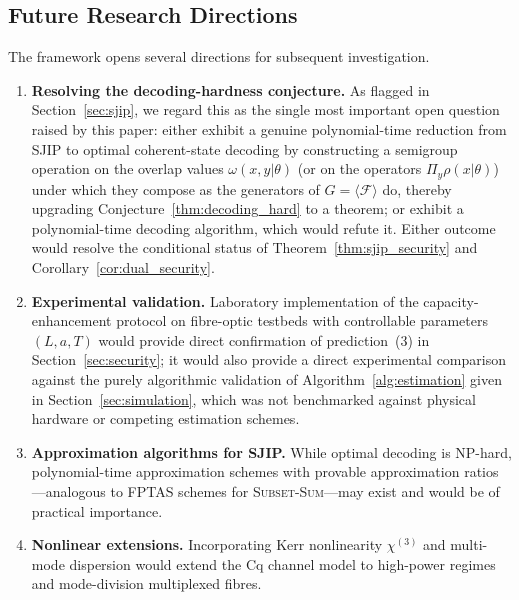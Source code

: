 \documentclass[journal,twocolumn]{IEEEtran}
\theoremstyle{definition}
\theoremstyle{plain}
\begin{document}
\subsection{Future Research Directions}

The framework opens several directions for subsequent investigation.

\begin{enumerate}[leftmargin=*, label=(\arabic*), itemsep=2pt]
  \item \textbf{Resolving the decoding-hardness conjecture.}  As
    flagged in Section~\ref{sec:sjip}, we regard this as the single
    most important open question raised by this paper: either
    exhibit a genuine polynomial-time reduction from SJIP to optimal
    coherent-state decoding by constructing a semigroup operation on
    the overlap values $\omega(x,y|\theta)$ (or on the operators
    $\Pi_y\rho(x|\theta)$) under which they compose as the generators
    of $G=\langle\mathcal F\rangle$ do, thereby upgrading
    Conjecture~\ref{thm:decoding_hard} to a theorem; or exhibit a
    polynomial-time decoding algorithm, which would refute it.
    Either outcome would resolve the conditional status of
    Theorem~\ref{thm:sjip_security} and
    Corollary~\ref{cor:dual_security}.

  \item \textbf{Experimental validation.}  Laboratory implementation
    of the capacity-enhancement protocol on fibre-optic testbeds
    with controllable parameters $(L, a, T)$ would provide direct
    confirmation of prediction~(3) in Section~\ref{sec:security}; it
    would also provide a direct experimental comparison against the
    purely algorithmic validation of Algorithm~\ref{alg:estimation}
    given in Section~\ref{sec:simulation}, which was not benchmarked
    against physical hardware or competing estimation schemes.

  \item \textbf{Approximation algorithms for SJIP.}  While optimal
    decoding is NP-hard, polynomial-time approximation schemes with
    provable approximation ratios---analogous to FPTAS schemes for
    \textsc{Subset-Sum}---may exist and would be of practical
    importance.

  \item \textbf{Nonlinear extensions.}  Incorporating Kerr
    nonlinearity $\chi^{(3)}$ and multi-mode dispersion would
    extend the Cq channel model to high-power regimes and
    mode-division multiplexed fibres.


\end{enumerate}
\end{document}
